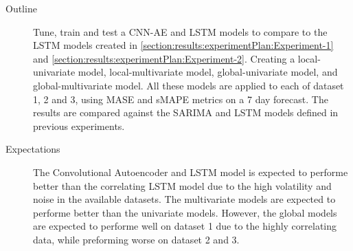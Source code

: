 \begin{description}
  \item[Outline]{
                  Tune, train and test a CNN-AE and LSTM models to compare to the LSTM models
                  created in \cref{section:results:experimentPlan:Experiment-1} and \cref{section:results:experimentPlan:Experiment-2}.
                  Creating a local-univariate model, local-multivariate model, global-univariate model, and global-multivariate model.
                  All these models are applied to each of dataset 1, 2 and 3, using MASE and sMAPE metrics on a 7 day forecast.
                  The results are compared against the SARIMA and LSTM models defined in previous experiments.
                }
\end{description}

\begin{description}
  \item[Expectations]{
                        The Convolutional Autoencoder and LSTM model is expected to performe better than the correlating LSTM model
                        due to the high volatility and noise in the available datasets.
                        The multivariate models are expected to performe better than the univariate models.
                        However, the global models are expected to performe well on dataset 1 due to the highly correlating data,
                        while preforming worse on dataset 2 and 3.
                     }
\end{description}